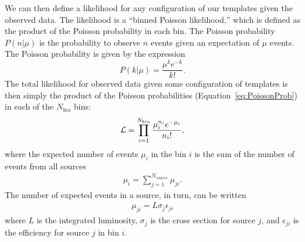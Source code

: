 We can then define a likelihood for any configuration of our templates given the
observed data.  The likelihood is a ``binned Poisson likelihood,'' which is
defined as the product of the Poisson probability in each bin.  The Poisson
probability $P(n|\mu)$ is the probability to observe $n$ events given an
expectation of $\mu$ events.  The Poisson probability is given by
the expression 
\begin{equation}
  P(k|\mu) = \frac{\mu^k e^{-k}}{k!}.
  \label{eq:PoissonProb}
\end{equation}
The total likelihood for observed data given some configuration of templates is
then simply the product of the Poisson probabilities (Equation~\ref{eq:PoissonProb}) 
in each of the $N_{bin}$ bins: 
\begin{eqnarray}
  {\cal L} = \prod_{i=1}^{N_{bin}} \frac{\mu_i^{n_i} e^{-\mu_i}}{n_i!},
  \label{eq:CoreLikelihood}
\end{eqnarray}
where the expected number of events $\mu_i$ in the bin $i$ is the sum of the number
of events from all sources
\begin{eqnarray}
  \mu_i = \sum_{j=1}^{N_{source}} \mu_{ji}. \nonumber
\end{eqnarray}
The number of expected events in a source, in turn, can be written
\begin{eqnarray}
  \mu_{ji} = L \sigma_j \epsilon_{ji}
  \label{eq:ShapeParameterization}
\end{eqnarray}
where $L$ is the integrated luminosity, $\sigma_j$ is the cross section
for source $j$, and $\epsilon_{ji}$ is the efficiency for source $j$ in bin
$i$.  

